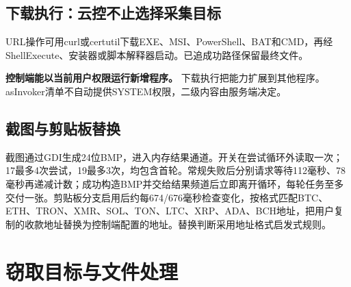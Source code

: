 \documentclass[UTF8,a4paper,zihao=5,fontset=windows]{ctexart}
\newcommand{\code}[1]{{\ttfamily\small #1}}
\begin{document}
\subsection{下载执行：云控不止选择采集目标}
URL操作可用\code{curl}或\code{certutil}下载EXE、MSI、PowerShell、BAT和CMD，再经ShellExecute、安装器或脚本解释器启动。已追成功路径保留最终文件。

\textbf{控制端能以当前用户权限运行新增程序。} 下载执行把能力扩展到其他程序。\code{asInvoker}清单不自动提供SYSTEM权限，二级内容由服务端决定。

\subsection{截图与剪贴板替换}
截图通过GDI生成24位BMP，进入内存结果通道。开关在尝试循环外读取一次；17最多4次尝试，19最多3次，均包含首轮。常规失败后分别请求等待112毫秒、78毫秒再递减计数；成功构造BMP并交给结果频道后立即离开循环，每轮任务至多交付一张。剪贴板分支启用后约每674/676毫秒检查变化，按格式匹配BTC、ETH、TRON、XMR、SOL、TON、LTC、XRP、ADA、BCH地址，把用户复制的收款地址替换为控制端配置的地址。替换判断采用地址格式启发式规则。

\clearpage\section{窃取目标与文件处理}
\label{sec:targets}
\end{document}
